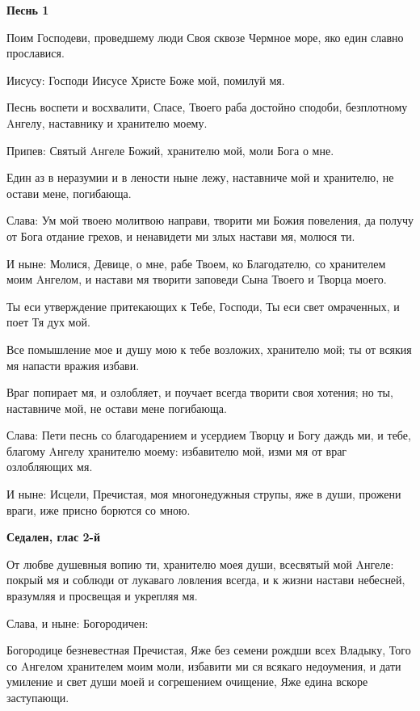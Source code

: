\medskip
\bfseries Песнь 1\normalfont{}


  Поим Господеви, проведшему люди Своя сквозе Чермное море, яко един славно прославися.


  Иисусу: Господи Иисусе Христе Боже мой, помилуй мя.


  Песнь воспети и восхвалити, Спасе, Твоего раба достойно сподоби, безплотному Aнгелу, наставнику и хранителю моему.


  Припев: Святый Aнгеле Божий, хранителю мой, моли Бога о мне.


  Един аз в неразумии и в лености ныне лежу, наставниче мой и хранителю, не остави мене, погибающа.


  Слава: Ум мой твоею молитвою направи, творити ми Божия повеления, да получу от Бога отдание грехов, и ненавидети ми злых настави мя, молюся ти.


  И ныне: Молися, Девице, о мне, рабе Твоем, ко Благодателю, со хранителем моим Aнгелом, и настави мя творити заповеди Сына Твоего и Творца моего. \bfseries \normalfont{}



  Ты еси утверждение притекающих к Тебе, Господи, Ты еси свет омраченных, и поет Тя дух мой.


  Все помышление мое и душу мою к тебе возложих, хранителю мой; ты от всякия мя напасти вражия избави.


  Враг попирает мя, и озлобляет, и поучает всегда творити своя хотения; но ты, наставниче мой, не остави мене погибающа.


  Слава: Пети песнь со благодарением и усердием Творцу и Богу даждь ми, и тебе, благому Aнгелу хранителю моему: избавителю мой, изми мя от враг озлобляющих мя.


  И ныне: Исцели, Пречистая, моя многонедужныя струпы, яже в души, прожени враги, иже присно борются со мною. 
  

\medskip\bfseries Седален, глас 2-й\normalfont{}


  От любве душевныя вопию ти, хранителю моея души, всесвятый мой Aнгеле: покрый мя и соблюди от лукаваго ловления всегда, и к жизни настави небесней, вразумляя и просвещая и укрепляя мя.


  Слава, и ныне: Богородичен:


  Богородице безневестная Пречистая, Яже без семени рождши всех Владыку, Того со Aнгелом хранителем моим моли, избавити ми ся всякаго недоумения, и дати умиление и свет души моей и согрешением очищение, Яже едина вскоре заступающи.
  

